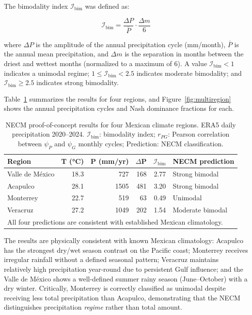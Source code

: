 \documentclass[gmd, manuscript]{copernicus}
\begin{document}
The bimodality index $\mathcal{I}_\mathrm{bim}$ was defined as:

\begin{equation}
\mathcal{I}_\mathrm{bim} = \frac{\Delta P}{\bar{P}} \cdot \frac{\Delta m}{6}
\end{equation}

where $\Delta P$ is the amplitude of the annual precipitation cycle
(mm/month), $\bar{P}$ is the annual mean precipitation, and $\Delta m$
is the separation in months between the driest and wettest months
(normalized to a maximum of 6). A value $\mathcal{I}_\mathrm{bim} < 1$
indicates a unimodal regime; $1 \leq \mathcal{I}_\mathrm{bim} < 2.5$
indicates moderate bimodality; and $\mathcal{I}_\mathrm{bim} \geq 2.5$
indicates strong bimodality.

Table~\ref{tab:proof_of_concept} summarizes the results for four
regions, and Figure~\ref{fig:multiregion} shows the annual precipitation
cycles and Nash dominance fractions for each.

\begin{table}[ht]
\centering
\small
\caption{NECM proof-of-concept results for four Mexican climate regions.
ERA5 daily precipitation 2020--2024. $\mathcal{I}_\mathrm{bim}$:
bimodality index; $r_{PG}$: Pearson correlation between $\psi_P$
and $\psi_G$ monthly cycles; Prediction: NECM classification.}
\label{tab:proof_of_concept}
\begin{tabular}{lrrrrl}
\hline
\textbf{Region} & \textbf{T (°C)} & \textbf{P (mm/yr)} &
\textbf{$\Delta$P} & \textbf{$\mathcal{I}_\mathrm{bim}$} &
\textbf{NECM prediction} \\
\hline
Valle de M\'exico & 18.3 & 727  & 168 & 2.77 & Strong bimodal \\
Acapulco          & 28.1 & 1505 & 481 & 3.20 & Strong bimodal \\
Monterrey         & 22.7 & 519  &  63 & 0.49 & Unimodal       \\
Veracruz          & 27.2 & 1049 & 202 & 1.54 & Moderate bimodal \\
\hline
\multicolumn{6}{l}{\small All four predictions are consistent with
established Mexican climatology.}\\
\hline
\end{tabular}
\end{table}

The results are physically consistent with known Mexican climatology:
Acapulco has the strongest dry/wet season contrast on the Pacific coast;
Monterrey receives irregular rainfall without a defined seasonal pattern;
Veracruz maintains relatively high precipitation year-round due to
persistent Gulf influence; and the Valle de M\'exico shows a well-defined
summer rainy season (June--October) with a dry winter. Critically,
Monterrey is correctly classified as unimodal despite receiving less
total precipitation than Acapulco, demonstrating that the NECM
distinguishes precipitation \textit{regime} rather than total amount.
\end{document}
